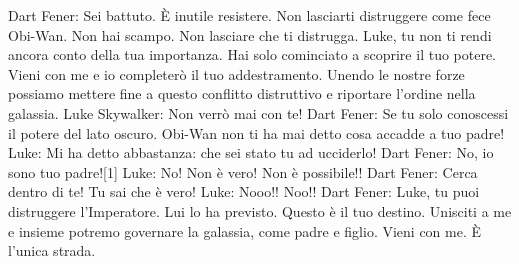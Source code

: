 Dart Fener: Sei battuto. È inutile resistere. Non lasciarti distruggere come fece Obi-Wan. Non hai scampo. Non lasciare che ti distrugga. Luke, tu non ti rendi ancora conto della tua importanza. Hai solo cominciato a scoprire il tuo potere. Vieni con me e io completerò il tuo addestramento. Unendo le nostre forze possiamo mettere fine a questo conflitto distruttivo e riportare l'ordine nella galassia.
Luke Skywalker: Non verrò mai con te!
Dart Fener: Se tu solo conoscessi il potere del lato oscuro. Obi-Wan non ti ha mai detto cosa accadde a tuo padre!
Luke: Mi ha detto abbastanza: che sei stato tu ad ucciderlo!
Dart Fener: No, io sono tuo padre![1]
Luke: No! Non è vero! Non è possibile!!
Dart Fener: Cerca dentro di te! Tu sai che è vero!
Luke: Nooo!! Noo!!
Dart Fener: Luke, tu puoi distruggere l'Imperatore. Lui lo ha previsto. Questo è il tuo destino. Unisciti a me e insieme potremo governare la galassia, come padre e figlio. Vieni con me. È l'unica strada.